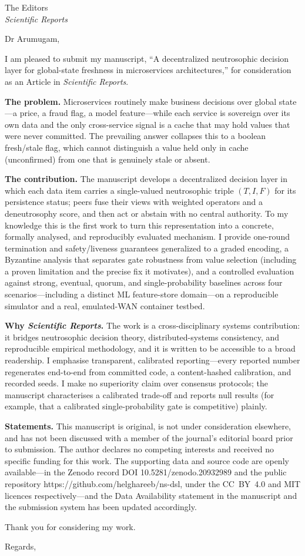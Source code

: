 \documentclass[11pt]{letter}
\begin{document}
\begin{letter}{The Editors\\\textit{Scientific Reports}}
\opening{Dr Arumugam,}

I am pleased to submit my manuscript, ``A decentralized neutrosophic decision layer for
global-state freshness in microservices architectures,'' for consideration as an Article in
\textit{Scientific Reports}.

\textbf{The problem.} Microservices routinely make business decisions over global state---a price,
a fraud flag, a model feature---while each service is sovereign over its own data and the only
cross-service signal is a cache that may hold values that were never committed. The prevailing answer
collapses this to a boolean fresh/stale flag, which cannot distinguish a value held only in cache
(unconfirmed) from one that is genuinely stale or absent.

\textbf{The contribution.} The manuscript develops a decentralized decision layer in which each data
item carries a single-valued neutrosophic triple $(T,I,F)$ for its persistence status; peers fuse their
views with weighted operators and a deneutrosophy score, and then act or abstain with no central
authority. To my knowledge this is the first work to turn this representation into a concrete, formally
analysed, and reproducibly evaluated mechanism. I provide one-round termination and safety/liveness
guarantees generalized to a graded encoding, a Byzantine analysis that separates gate robustness from
value selection (including a proven limitation and the precise fix it motivates), and a controlled
evaluation against strong, eventual, quorum, and single-probability baselines across four
scenarios---including a distinct ML feature-store domain---on a reproducible simulator and a real,
emulated-WAN container testbed.

\textbf{Why \textit{Scientific Reports}.} The work is a cross-disciplinary systems contribution: it
bridges neutrosophic decision theory, distributed-systems consistency, and reproducible empirical
methodology, and it is written to be accessible to a broad readership. I emphasise transparent,
calibrated reporting---every reported number regenerates end-to-end from committed code, a
content-hashed calibration, and recorded seeds. I make no superiority claim over consensus protocols;
the manuscript characterises a calibrated trade-off and reports null results (for example, that a
calibrated single-probability gate is competitive) plainly.

\textbf{Statements.} This manuscript is original, is not under consideration elsewhere, and has not
been discussed with a member of the journal's editorial board prior to submission. The author declares
no competing interests and received no specific funding for this work. The supporting data and source
code are openly available---in the Zenodo record DOI 10.5281/zenodo.20932989 and the public repository
https://github.com/helghareeb/ns-dsl, under the CC~BY~4.0 and MIT licences respectively---and the
Data Availability statement in the manuscript and the submission system has been updated accordingly.

Thank you for considering my work.

\closing{Regards,}
\end{letter}
\end{document}
